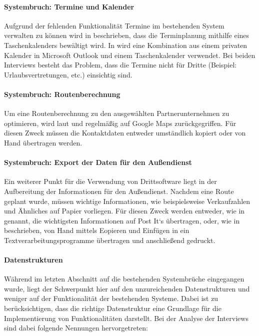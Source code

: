 \documentclass[Bachelorarbeit.tex]{subfiles}
\begin{document}
\paragraph{Systembruch: Termine und Kalender}
Aufgrund der fehlenden Funktionalität Termine im bestehenden System verwalten zu können wird in  beschrieben, dass die Terminplanung mithilfe eines Taschenkalenders bewältigt wird. 
In  wird eine Kombination aus einem privaten Kalender in Microsoft Outlook und einem Taschenkalender verwendet. 
Bei beiden Interviews besteht das Problem, dass die Termine nicht für Dritte (Beispiel: Urlaubsvertretungen, etc.) einsichtig sind.

\paragraph{Systembruch: Routenberechnung}
Um eine Routenberechnung zu den ausgewählten Partnerunternehmen zu optimieren, wird laut  und  regelmäßig auf Google Maps zurückgegriffen. 
Für diesen Zweck müssen die Kontaktdaten entweder umständlich kopiert oder von Hand übertragen werden.


\paragraph{Systembruch: Export der Daten für den Außendienst}

Ein weiterer Punkt für die Verwendung von Drittsoftware liegt in der Aufbereitung der Informationen für den Außendienst.
Nachdem eine Route geplant wurde, müssen wichtige Informationen, wie beispielsweise Verkaufzahlen und Ähnliches auf Papier vorliegen. 
Für diesen Zweck werden entweder, wie in  genannt, die wichtigsten Informationen auf Post It`s übertragen, oder, wie in  beschrieben, von Hand mittels Eopieren und Einfügen in ein Textverarbeitungsprogramme übertragen und anschließend gedruckt.
\\ [1.0cm]

\paragraph{Datenstrukturen}
\label{interviewsAnalyseDatenstrukturen}
Während im letzten Abschnitt auf die bestehenden Systembrüche eingegangen wurde, liegt der Schwerpunkt hier auf den unzureichenden Datenstrukturen und weniger auf der Funktionalität der bestehenden Systeme. 
Dabei ist zu berücksichtigen, dass die richtige Datenstruktur eine Grundlage für die Implementierung von Funktionalitäten darstellt. 
Bei der Analyse der Interviews sind dabei folgende Nennungen hervorgetreten:
\end{document}

